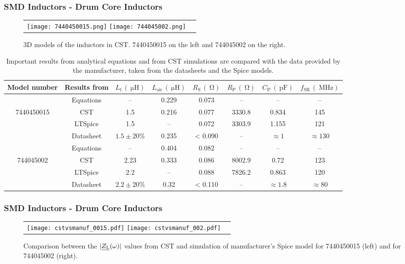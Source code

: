 \begin{frame}
	\frametitle{SMD Inductors - Drum Core Inductors}
	\begin{figure}
		\centering
		\begin{tabular}{cc}
			\texttt{[image: 7440450015.png]}
			\hspace{25pt}
			\texttt{[image: 744045002.png]}
		\end{tabular}
		\caption{3D models of the inductors in CST. 7440450015 on the left and 744045002 on the right.}
	\end{figure}
	\vspace{-15pt}
	\begin{table}[ptbh]
		\centering
		\begin{tabular}{|c|c|c c c c c c|}
			\hline
			Model number & Results from & $L_\mathrm{f}\,(\SI{}{\micro\henry})$ & $L_\mathrm{air}\,(\SI{}{\micro\henry})$ & $R_\mathrm{S}\,(\SI{}{\ohm})$ & $R_\mathrm{P}\,(\SI{}{\ohm})$ & $C_\mathrm{P}\,(\SI{}{\pico\farad})$ & $f_\mathrm{SR}\,(\SI{}{\mega\hertz})$\\
			\hline
			& Equations & -- & 0.229 & 0.073 & -- & -- & --\\
			\multirow{ 2}{*}{7440450015} & CST & 1.5 & 0.216 & 0.077 & 3330.8 & 0.834 & 145\\
			& LTSpice & 1.5 & -- & 0.072 & 3303.9 & 1.155 & 121\\
			& Datasheet & $1.5\pm20\%$ & 0.235 & < 0.090 & -- & $\approx 1$ & $\approx 130$\\
			\hline
			& Equations & -- & 0.404  & 0.082 & -- & -- & --\\
			\multirow{ 2}{*}{744045002} & CST & 2.23 & 0.333 & 0.086 & 8002.9 & 0.72 & 123\\
			& LTSpice & 2.2 & --  & 0.088 & 7826.2 & 0.863 & 120\\
			& Datasheet & $2.2\pm20\%$ & 0.32 & < 0.110 & -- & $\approx1.8$ & $\approx80$\\
			\hline
		\end{tabular} 
		\caption{Important results from analytical equations and from CST simulations are compared with the data provided by the manufacturer, taken from the datasheets and the Spice models.}
		\label{tab:calc_compare}
	\end{table}
\end{frame}
	
\begin{frame}
	\frametitle{SMD Inductors - Drum Core Inductors}
	\begin{figure}
		\begin{tabular}{cc}
			\texttt{[image: cstvsmanuf\_0015.pdf]}
			\texttt{[image: cstvsmanuf\_002.pdf]}
		\end{tabular}
		\caption{Comparison between the $\lvert\underline{Z_\mathrm{L}}(\omega)\rvert$ values from CST and simulation of manufacturer's Spice model for 7440450015 (left) and for 744045002 (right).}
	\end{figure}
\end{frame}

